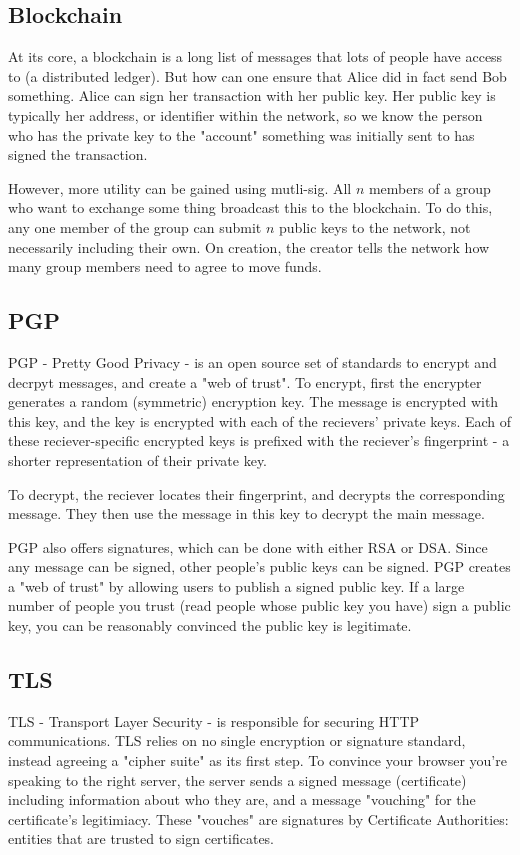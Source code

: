 \documentclass{article}
\begin{document}
\subsection{Blockchain}
At its core, a blockchain is a long list of messages that lots of people have access to (a distributed ledger).
But how can one ensure that Alice did in fact send Bob something.
Alice can sign her transaction with her public key.
Her public key is typically her address, or identifier within the network,
so we know the person who has the private key to the "account"
something was initially sent to has signed the transaction.

However, more utility can be gained using mutli-sig.
All $n$ members of a group who want to exchange some thing broadcast this to the blockchain.
To do this, any one member of the group can submit $n$ public keys to the network, not necessarily including their own.
On creation, the creator tells the network how many group members need to agree to move funds.

\subsection{PGP}
PGP - Pretty Good Privacy - is an open source set of standards to
encrypt and decrpyt messages, and create a "web of trust".
To encrypt, first the encrypter generates a random (symmetric) encryption key.
The message is encrypted with this key,
and the key is encrypted with each of the recievers' private keys.
Each of these reciever-specific encrypted keys is prefixed with the
reciever's fingerprint - a shorter representation of their private key.

To decrypt, the reciever locates their fingerprint, and decrypts the corresponding message.
They then use the message in this key to decrypt the main message.

PGP also offers signatures, which can be done with either RSA or DSA.
Since any message can be signed, other people's public keys can be signed.
PGP creates a "web of trust" by allowing users to publish a signed public key.
If a large number of people you trust (read people whose public key you have)
sign a public key, you can be reasonably convinced the public key is legitimate.
\subsection{TLS}
TLS - Transport Layer Security - is responsible for securing HTTP communications.
TLS relies on no single encryption or signature standard, instead agreeing a "cipher suite" as its first step.
To convince your browser you're speaking to the right server,
the server sends a signed message (certificate) including information about who they are,
and a message "vouching" for the certificate's legitimiacy.
These "vouches" are signatures by Certificate Authorities: entities that are trusted to sign certificates.
\end{document}
